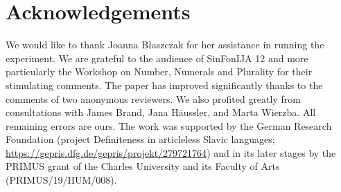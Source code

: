 \documentclass[output=paper]{langscibook}
\begin{document}
\section*{Acknowledgements}
We would like to thank Joanna Błaszczak for her assistance in running the experiment. We are grateful to the audience of SinFonIJA 12 and more particularly the Workshop on Number, Numerals and Plurality for their stimulating comments. The paper has improved significantly thanks to the comments of two anonymous reviewers. We also profited greatly from consultations with James Brand, Jana Häussler, and Marta Wierzba. All remaining errors are ours. The work was supported by the German Research Foundation (project Definiteness in articleless Slavic languages; \url{https://gepris.dfg.de/gepris/projekt/279721764}) and in its later stages by the PRIMUS grant of the Charles University and its Faculty of Arts (PRIMUS/19/HUM/008).

{\sloppy\printbibliography[heading=subbibliography,notkeyword=this]}
\end{document}
